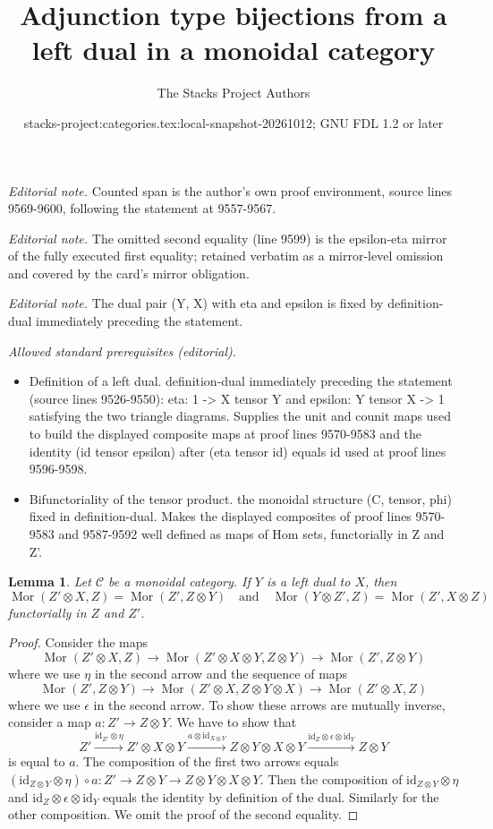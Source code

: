 \documentclass{stacks-project}
\title{Adjunction type bijections from a left dual in a monoidal category}
\author{The Stacks Project Authors}
\date{stacks-project:categories.tex:local-snapshot-20261012; GNU FDL 1.2 or later}
\theoremstyle{plain}
\newtheorem{lemma}[subsection]{Lemma}
\theoremstyle{definition}
\theoremstyle{remark}
\numberwithin{equation}{subsection}
\def\Mor{\mathop{\mathrm{Mor}}\nolimits}
\begin{document}
\maketitle
\noindent\textit{Editorial note.} Counted span is the author's own proof environment, source lines 9569-9600, following the statement at 9557-9567.\par\medskip
\noindent\textit{Editorial note.} The omitted second equality (line 9599) is the epsilon-eta mirror of the fully executed first equality; retained verbatim as a mirror-level omission and covered by the card's mirror obligation.\par\medskip
\noindent\textit{Editorial note.} The dual pair (Y, X) with eta and epsilon is fixed by definition-dual immediately preceding the statement.\par\medskip
\noindent\textit{Allowed standard prerequisites (editorial).}\begin{itemize}
\item Definition of a left dual. definition-dual immediately preceding the statement (source lines 9526-9550): eta: 1 -> X tensor Y and epsilon: Y tensor X -> 1 satisfying the two triangle diagrams. Supplies the unit and counit maps used to build the displayed composite maps at proof lines 9570-9583 and the identity (id tensor epsilon) after (eta tensor id) equals id used at proof lines 9596-9598.
\item Bifunctoriality of the tensor product. the monoidal structure (C, tensor, phi) fixed in definition-dual. Makes the displayed composites of proof lines 9570-9583 and 9587-9592 well defined as maps of Hom sets, functorially in Z and Z'.
\end{itemize}\medskip
\begin{lemma}
\label{lemma-left-dual}
Let $\mathcal{C}$ be a monoidal category. If $Y$ is a left dual to $X$,
then
$$
\Mor(Z' \otimes X, Z) = \Mor(Z', Z \otimes Y)
\quad\text{and}\quad
\Mor(Y \otimes Z', Z) = \Mor(Z', X \otimes Z)
$$
functorially in $Z$ and $Z'$.
\end{lemma}

\begin{proof}
Consider the maps
$$
\Mor(Z' \otimes X, Z) \to
\Mor(Z' \otimes X \otimes Y, Z \otimes Y) \to
\Mor(Z', Z \otimes Y)
$$
where we use $\eta$ in the second arrow
and the sequence of maps
$$
\Mor(Z', Z \otimes Y) \to
\Mor(Z' \otimes X, Z \otimes Y \otimes X) \to
\Mor(Z' \otimes X, Z)
$$
where we use $\epsilon$ in the second arrow.
To show these arrows are mutually inverse, consider a map
$a : Z' \to Z \otimes Y$. We have to show that
$$
Z' \xrightarrow{\text{id}_{Z'} \otimes \eta}
Z' \otimes X \otimes Y \xrightarrow{a \otimes \text{id}_{X \otimes Y}}
Z \otimes Y \otimes X \otimes Y
\xrightarrow{\text{id}_Z \otimes \epsilon \otimes \text{id}_Y}
Z \otimes Y
$$
is equal to $a$. The composition of the first two arrows equals
$(\text{id}_{Z \otimes Y} \otimes \eta) \circ a :
Z' \to Z \otimes Y \to Z \otimes Y \otimes X \otimes Y$.
Then the composition of $\text{id}_{Z \otimes Y} \otimes \eta$
and $\text{id}_Z \otimes \epsilon \otimes \text{id}_Y$ equals
the identity by definition of the dual. Similarly for the other
composition. We omit the proof of the second equality.
\end{proof}
\end{document}

